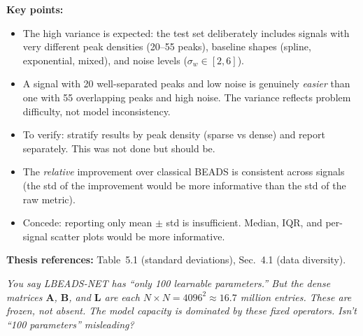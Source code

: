 \documentclass[11pt, letterpaper]{article}
\newcounter{qcounter}
\newcommand{\question}[1]{%
  \stepcounter{qcounter}%
  \begin{questionbox}[Q\theqcounter]%
    \itshape #1%
  \end{questionbox}%
}
\begin{document}
\begin{answerbox}
\textbf{Key points:}
\begin{itemize}[nosep]
  \item The high variance is expected: the test set deliberately
        includes signals with very different peak densities (20--55
        peaks), baseline shapes (spline, exponential, mixed), and
        noise levels ($\sigma_w \in [2, 6]$).
  \item A signal with 20 well-separated peaks and low noise is
        genuinely \emph{easier} than one with 55 overlapping peaks
        and high noise.  The variance reflects problem difficulty,
        not model inconsistency.
  \item To verify: stratify results by peak density (sparse vs
        dense) and report separately.  This was not done but should be.
  \item The \emph{relative} improvement over classical BEADS is
        consistent across signals (the std of the improvement would
        be more informative than the std of the raw metric).
  \item Concede: reporting only mean $\pm$ std is insufficient.
        Median, IQR, and per-signal scatter plots would be more
        informative.
\end{itemize}
\textbf{Thesis references:} Table~5.1 (standard deviations), Sec.~4.1 (data diversity).
\end{answerbox}

\question{You say LBEADS-NET has ``only 100 learnable parameters.''  But the
dense matrices $\mathbf{A}$, $\mathbf{B}$, and $\mathbf{L}$ are
each $N \times N = 4096^2 \approx 16.7$ million entries.  These are
frozen, not absent.  The model capacity is dominated by these
fixed operators.  Isn't ``100 parameters'' misleading?}
\end{document}
